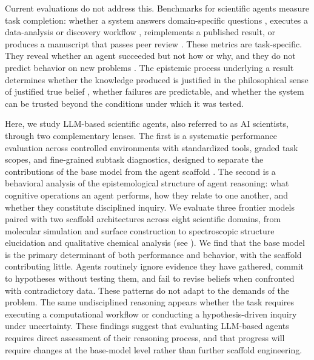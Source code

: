Current evaluations do not address this. Benchmarks for scientific agents measure task completion: whether a system answers domain-specific questions \autocite{mirza2025framework,alampara2025macbench,laurent2024lab}, executes a data-analysis or discovery workflow \autocite{chen2024scienceagentbench,shen2026sciagentgym,cui2025curie,mandal2025evaluating}, reimplements a published result, or produces a manuscript that passes peer review \autocite{alampara2025lessons,chen2025mlr,bragg2025astabench,rabanser2026towards,mitchener2025bixbench0}. These metrics are task-specific. They reveal whether an agent succeeded but not how or why, and they do not predict behavior on new problems \autocite{Zhou2026}.
The epistemic process underlying a result determines whether the knowledge produced is justified in the philosophical sense of justified true belief \autocite{sep-knowledge-analysis}, whether failures are predictable, and whether the system can be trusted beyond the conditions under which it was tested.

Here, we study LLM-based scientific agents, also referred to as AI scientists, through two complementary lenses. 
The first is a systematic performance evaluation across controlled environments with standardized tools, graded task scopes, and fine-grained subtask diagnostics, designed to separate the contributions of the base model from the agent scaffold \autocite{meirelesinfluence}. The second is a behavioral analysis of the epistemological structure of agent reasoning: what cognitive operations an agent performs, how they relate to one another, and whether they constitute disciplined inquiry. 
We evaluate three frontier models paired with two scaffold architectures across eight scientific domains, from molecular simulation and surface construction to spectroscopic structure elucidation and qualitative chemical analysis (see ). We find that the base model is the primary determinant of both performance and behavior, with the scaffold contributing little. Agents routinely ignore evidence they have gathered, commit to hypotheses without testing them, and fail to revise beliefs when confronted with contradictory data. These patterns do not adapt to the demands of the problem. The same undisciplined reasoning appears whether the task requires executing a computational workflow or conducting a hypothesis-driven inquiry under uncertainty. These findings suggest that evaluating LLM-based agents requires direct assessment of their reasoning process, and that progress will require changes at the base-model level rather than further scaffold engineering.


